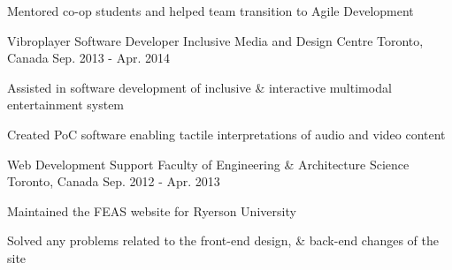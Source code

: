 \begin{cventries}
{\begin{cvitems}
        \item {Mentored co-op students and helped team transition to Agile Development}
      \end{cvitems}
    }
  \cventry
    {Vibroplayer Software Developer}
    {Inclusive Media and Design Centre}
    {Toronto, Canada}
    {Sep. 2013 - Apr. 2014}
    {
      \begin{cvitems}
        \item {Assisted in software development of inclusive \& interactive multimodal entertainment system}
        \item {Created PoC software enabling tactile interpretations of audio and video content}
      \end{cvitems}
    }
  \cventry
    {Web Development Support}
    {Faculty of Engineering \& Architecture Science}
    {Toronto, Canada}
    {Sep. 2012 - Apr. 2013}
    {
      \begin{cvitems}
        \item {Maintained the FEAS website for Ryerson University}
        \item {Solved any problems related to the front-end design, \& back-end changes of the site}
     \end{cvitems}
    }
\end{cventries}

